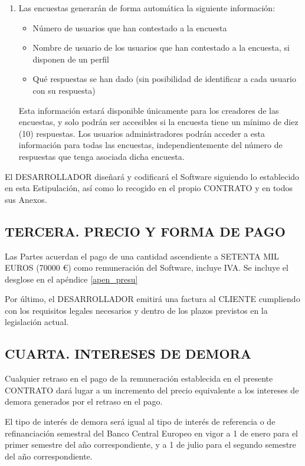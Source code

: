 \documentclass[a4paper,11pt]{report}
\begin{document}
\begin{enumerate}
		\item Las encuestas generarán de forma automática la siguiente información:
			\begin{itemize}
				\item Número de usuarios que han contestado a la encuesta
				\item Nombre de usuario de los usuarios que han contestado a la encuesta,
				si disponen de un perfil
				\item Qué respuestas se han dado (sin posibilidad de identificar
				a cada usuario con su respuesta)
			\end{itemize}
		Esta información estará disponible únicamente para los creadores de las
		encuestas, y solo podrán ser accesibles si la encuesta tiene un mínimo de
		diez (10) respuestas. Los usuarios administradores podrán acceder
		a esta información para todas las encuestas, independientemente del número
		de respuestas que tenga asociada dicha encuesta.
	\end{enumerate}

	El DESARROLLADOR diseñará y codificará el Software siguiendo lo
	establecido en esta Estipulación, así como lo recogido en el propio
	CONTRATO y en todos sus Anexos.

	\subsection*{TERCERA. PRECIO Y FORMA DE PAGO}

	Las Partes acuerdan el pago de una cantidad ascendiente a SETENTA MIL EUROS
	(70000 \euro) como remuneración del Software, incluye IVA.
	Se incluye el desglose en el apéndice \ref{apen_presu}

	Por último, el DESARROLLADOR emitirá una factura al CLIENTE cumpliendo
	con los requisitos legales necesarios y dentro de los plazos previstos
	en la legislación actual.

	\subsection*{CUARTA. INTERESES DE DEMORA}

	Cualquier	retraso en el pago de la remuneración establecida en el presente
	CONTRATO dará lugar a un incremento del precio equivalente a los
	intereses de demora generados por el retraso en el pago.

	El tipo de interés de demora será igual al tipo de interés de referencia
	o de refinanciación semestral del Banco Central Europeo en vigor a 1 de
	enero para el primer semestre del año correspondiente, y a 1 de julio
	para el segundo semestre del año correspondiente.
\end{document}
